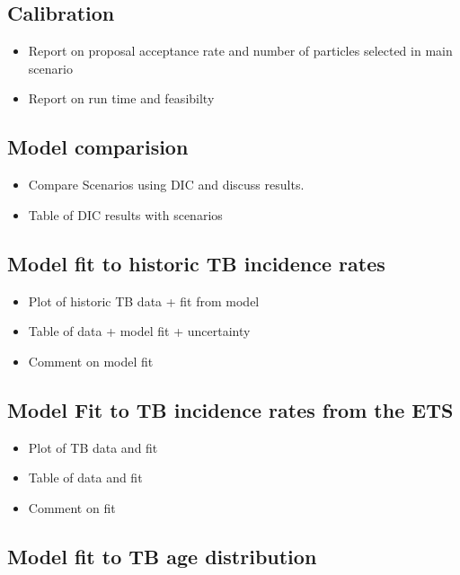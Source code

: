 \documentclass[11pt,twoside]{bristolthesis}
\providecommand{\tightlist}{%
  \setlength{\itemsep}{0pt}\setlength{\parskip}{0pt}}
\begin{document}
  \hypertarget{calibration-1}{%
  \subsection{Calibration}\label{calibration-1}}
  \begin{itemize}
  \tightlist
  \item
    Report on proposal acceptance rate and number of particles selected in main scenario
  \item
    Report on run time and feasibilty
  \end{itemize}
  \hypertarget{model-comparision-1}{%
  \subsection{Model comparision}\label{model-comparision-1}}
  \begin{itemize}
  \tightlist
  \item
    Compare Scenarios using DIC and discuss results.
  \item
    Table of DIC results with scenarios
  \end{itemize}
  \hypertarget{model-fit-to-historic-tb-incidence-rates}{%
  \subsection{Model fit to historic TB incidence rates}\label{model-fit-to-historic-tb-incidence-rates}}
  \begin{itemize}
  \tightlist
  \item
    Plot of historic TB data + fit from model
  \item
    Table of data + model fit + uncertainty
  \item
    Comment on model fit
  \end{itemize}
  \hypertarget{model-fit-to-tb-incidence-rates-from-the-ets}{%
  \subsection{Model Fit to TB incidence rates from the ETS}\label{model-fit-to-tb-incidence-rates-from-the-ets}}
  \begin{itemize}
  \tightlist
  \item
    Plot of TB data and fit
  \item
    Table of data and fit
  \item
    Comment on fit
  \end{itemize}
  \hypertarget{model-fit-to-tb-age-distribution}{%
  \subsection{Model fit to TB age distribution}\label{model-fit-to-tb-age-distribution}}
\end{document}
